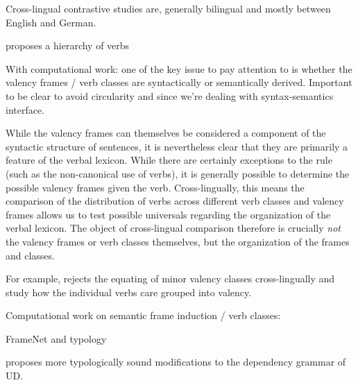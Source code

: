 Cross-lingual contrastive studies are, generally bilingual and mostly between English and German. 






\citet{tsunoda1981, tsunoda1985} proposes a hierarchy of verbs
\citep{tsunoda2015}

With computational work: one of the key issue to pay attention to is whether the valency frames / verb classes are syntactically or semantically derived. Important to be clear to avoid circularity and since we're dealing with syntax-semantics interface.


While the valency frames can themselves be considered a component of the syntactic structure of sentences, it is nevertheless clear that they are primarily a feature of the verbal lexicon. While there are certainly exceptions to the rule (such as the non-canonical use of verbs), it is generally possible to determine the possible valency frames given the verb. Cross-lingually, this means the comparison of the distribution of verbs across different verb classes and valency frames allows us to test possible universals regarding the organization of the verbal lexicon. The object of cross-lingual comparison therefore is crucially \textit{not} the valency frames or verb classes themselves, but the organization of the frames and classes.


For example, \citet{say2014} rejects the equating of minor valency classes cross-lingually and study how the individual verbs care grouped into valency.

Computational work on semantic frame induction / verb classes:  \citet{abend2009, basili1993, bickel2014, dowty1991, fellbaum1998, fillmore1968, furstenau2012, kipper-schuler2005, kipper2008, korhonen2006, levin2015, majewska2018, majewska2020, majewska2021, miller1990, miller1995, navarretta2000, palmer2005, say2014, sayeed2018, schulteimwalde2002, schulteimwalde2003, schulteimwalde2006, snider2006, sun2008, sun2009, sun2013, titov2012, watanabe2010, yamada2021} 

\citet{baker2020, ellsworth2021} FrameNet and typology

\citet{croft2017} proposes more typologically sound modifications to the dependency grammar of UD. 


